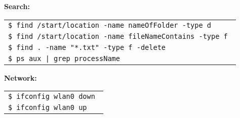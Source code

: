 \documentclass[10pt,landscape]{article}
\begin{document}
\begin{multicols}{3}
\vspace{0.7em}
\textbf{Search:}\\
\begin{tabular}{l}
\hspace{1ex} \texttt{\$ find /start/location -name nameOfFolder -type d }\\
\hspace{1ex} \texttt{\$ find /start/location -name fileNameContains -type f }\\
\hspace{1ex} \texttt{\$ find . -name "*.txt" -type f -delete }\\
\hspace{1ex} \texttt{\$ ps aux | grep processName }\\
\end{tabular}

\vspace{0.7em}
\textbf{Network:}\\
\begin{tabular}{l}
\hspace{1ex} \texttt{\$ ifconfig wlan0 down }\\
\hspace{1ex} \texttt{\$ ifconfig wlan0 up }\\
\end{tabular}

\vfill

\end{multicols}
 
\end{document}
